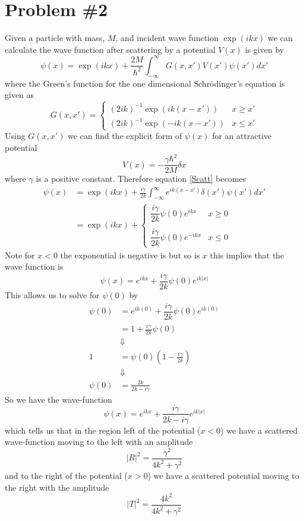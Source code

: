 \documentclass[11pt]{article}
\numberwithin{equation}{section}
\begin{document}
\section{Problem \#2}
Given a particle with mass, $M$, and incident wave function $\exp(ikx)$ we can calculate the
wave function after scattering by a potential $V(x)$ is given by 
\begin{equation}
\psi(x) = \exp(ikx) + \frac{2M}{\hbar^2}\int_{-\infty}^{\infty}G(x,x')V(x')\psi(x')dx'
\label{Scatt}
\end{equation}
where the Green's function for the one dimensional Schr\"{o}dinger's equation is given as
$$G(x,x') = \left\{\begin{array}{lc}
                  (2ik)^{-1}\exp(ik(x-x'))   &x\ge{x'}\\
                  (2ik)^{-1}\exp(-ik(x-x'))   &x\le{x'}
            \end{array}\right.$$
Using $G(x,x')$ we can find the explicit form of $\psi(x)$ for an attractive potential 
$$V(x) = -\frac{\gamma\hbar^2}{2M}\delta{x}$$
where $\gamma$ is a positive constant. Therefore equation \ref{Scatt} becomes
\begin{align*}
\psi(x) &= \exp(ikx) + \frac{i\gamma}{2k}\int_{-\infty}^{\infty}e^{ik(x-x')}\delta(x')\psi(x')dx'\\
&= \exp(ikx) + 
\left\{\begin{array}{lc}
\dfrac{i\gamma}{2k}\psi(0)e^{ikx}  &x\ge{0}\\
\\
\dfrac{i\gamma}{2k}\psi(0)e^{-ikx}  &x\le{0}
\end{array}\right.
\end{align*}
Note for $x<0$ the exponential is negative is but so is $x$ this implies that the wave 
function is 
$$\psi(x) = e^{ikx} + \dfrac{i\gamma}{2k}\psi(0)e^{ik|x|}$$
This allows us to solve for $\psi(0)$ by
\begin{align*}
\psi(0) &= e^{ik(0)} + \dfrac{i\gamma}{2k}\psi(0)e^{ik(0)}\\
&= 1 + \frac{i\gamma}{2k}\psi(0)\\
&\Downarrow\\
1 &= \psi(0)\left(1-\frac{i\gamma}{2k}\right)\\
&\Downarrow\\
\psi(0) &= \frac{2k}{2k-i\gamma}
\end{align*}
So we have the wave-function 
$$\psi(x) = e^{ikx} + \frac{i\gamma}{2k-i\gamma}e^{ik|x|}$$
which tells us that in the region left of the potential ($x<0$) we have a scattered 
wave-function moving to the left with an amplitude 
$$|R|^2 = \frac{\gamma^2}{4k^2+\gamma^2}$$
and to the right of the potential ($x>0$) we have a scattered potential moving to the right
with the amplitude 
$$|T|^2 = \frac{4k^2}{4k^2+\gamma^2}$$
\end{document}
